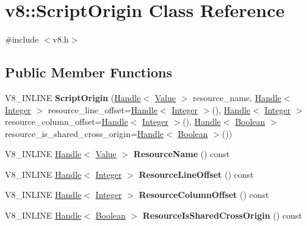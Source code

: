 \hypertarget{classv8_1_1ScriptOrigin}{\section{v8\-:\-:Script\-Origin Class Reference}
\label{classv8_1_1ScriptOrigin}
}


{\ttfamily \#include $<$v8.\-h$>$}

\subsection*{Public Member Functions}
\begin{DoxyCompactItemize}
\item 
\hypertarget{classv8_1_1ScriptOrigin_a59a6e8e17f7206e907d2c46c7c962eab}{V8\-\_\-\-I\-N\-L\-I\-N\-E {\bfseries Script\-Origin} (\hyperlink{classv8_1_1Handle}{Handle}$<$ \hyperlink{classv8_1_1Value}{Value} $>$ resource\-\_\-name, \hyperlink{classv8_1_1Handle}{Handle}$<$ \hyperlink{classv8_1_1Integer}{Integer} $>$ resource\-\_\-line\-\_\-offset=\hyperlink{classv8_1_1Handle}{Handle}$<$ \hyperlink{classv8_1_1Integer}{Integer} $>$(), \hyperlink{classv8_1_1Handle}{Handle}$<$ \hyperlink{classv8_1_1Integer}{Integer} $>$ resource\-\_\-column\-\_\-offset=\hyperlink{classv8_1_1Handle}{Handle}$<$ \hyperlink{classv8_1_1Integer}{Integer} $>$(), \hyperlink{classv8_1_1Handle}{Handle}$<$ \hyperlink{classv8_1_1Boolean}{Boolean} $>$ resource\-\_\-is\-\_\-shared\-\_\-cross\-\_\-origin=\hyperlink{classv8_1_1Handle}{Handle}$<$ \hyperlink{classv8_1_1Boolean}{Boolean} $>$())}\label{classv8_1_1ScriptOrigin_a59a6e8e17f7206e907d2c46c7c962eab}

\item 
\hypertarget{classv8_1_1ScriptOrigin_a289502d71720ca10e53b4a32d9226f58}{V8\-\_\-\-I\-N\-L\-I\-N\-E \hyperlink{classv8_1_1Handle}{Handle}$<$ \hyperlink{classv8_1_1Value}{Value} $>$ {\bfseries Resource\-Name} () const }\label{classv8_1_1ScriptOrigin_a289502d71720ca10e53b4a32d9226f58}

\item 
\hypertarget{classv8_1_1ScriptOrigin_a0735178b8afef9169a3481cf6cd7c557}{V8\-\_\-\-I\-N\-L\-I\-N\-E \hyperlink{classv8_1_1Handle}{Handle}$<$ \hyperlink{classv8_1_1Integer}{Integer} $>$ {\bfseries Resource\-Line\-Offset} () const }\label{classv8_1_1ScriptOrigin_a0735178b8afef9169a3481cf6cd7c557}

\item 
\hypertarget{classv8_1_1ScriptOrigin_a6d1b4cb1be2b6589151a029974cd1a60}{V8\-\_\-\-I\-N\-L\-I\-N\-E \hyperlink{classv8_1_1Handle}{Handle}$<$ \hyperlink{classv8_1_1Integer}{Integer} $>$ {\bfseries Resource\-Column\-Offset} () const }\label{classv8_1_1ScriptOrigin_a6d1b4cb1be2b6589151a029974cd1a60}

\item 
\hypertarget{classv8_1_1ScriptOrigin_a632d2d30405d42512af609861e486bf2}{V8\-\_\-\-I\-N\-L\-I\-N\-E \hyperlink{classv8_1_1Handle}{Handle}$<$ \hyperlink{classv8_1_1Boolean}{Boolean} $>$ {\bfseries Resource\-Is\-Shared\-Cross\-Origin} () const }\label{classv8_1_1ScriptOrigin_a632d2d30405d42512af609861e486bf2}

\end{DoxyCompactItemize}



